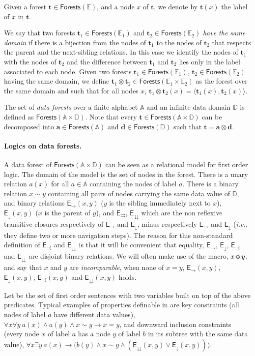 \documentclass{CSML}
\newcommand\ra{\ensuremath{\rightarrow}}
\newcommand\dataeq{\ensuremath{\sim}}
\newcommand\A{\ensuremath{\mathbb{A}}\xspace}
\newcommand\D{\mathbb{D}}
\newcommand\E{\mathbb{E}}
\newcommand\Forests{\mathsf{Forests}}
\newcommand\tree{\boldsymbol{t}}
\newcommand\atree{\boldsymbol{a}}
\newcommand\dtree{\boldsymbol{d}}
\newcommand\EE{\mathsf{E}}
\newcommand\NS{\EE_{\rightarrow}}
\newcommand\PC{\EE_{\downarrow}}
\newcommand\SAD{\EE_{\downdownarrows}}
\newcommand\SFS{\EE_{\rightrightarrows}}
\renewcommand\parallel{\mathbin{\!<\mkern-12mu>\!}}
\begin{document}
Given a forest $\tree \in \Forests(\E)$, and a node $x$ of $\tree$, we denote
by $\tree(x)$ the label of $x$ in $\tree$.

We say that two forests $\tree_1 \in \Forests(\E_1)$ 
and $\tree_2 \in \Forests(\E_2)$ 
\emph{have the same domain} if there is a bijection from the
nodes of $\tree_1$ to the nodes of $\tree_2$ 
that respects the parent and the next-sibling relations. 
In this case we identify the nodes of $\tree_1$ with
the nodes of $\tree_2$ and the difference between $\tree_1$ and $\tree_2$ lies
only in the label associated to each node. 
Given two forests $\tree_1 \in \Forests(\E_1)$, 
$\tree_2 \in \Forests(\E_2)$ having the same domain, 
we define $\tree_1 \otimes \tree_2 \in \Forests(\E_1\times\E_2)$ 
as the forest over the same domain 
and such that for all nodes $x$, 
$\tree_1 \otimes \tree_2 (x) = \langle \tree_1(x),\tree_2(x)\rangle$.

The set of \emph{data forests} over a finite alphabet $\A$ 
and an infinite data domain $\D$  is defined as $\Forests(\A {\times} \D)$. 
Note that every $\tree \in \Forests(\A {\times} \D)$ 
can be decomposed into $\atree \in \Forests(\A)$ 
and $\dtree \in \Forests(\D)$ such that $\tree = \atree \otimes \dtree$.


\paragraph{Logics on data forests.}
A data forest of $\Forests(\A {\times} \D)$ can be seen as a relational model for
first order logic.  The domain of the model is the set of nodes in the
forest.  There is a unary relation $a(x)$ for all $a \in \A$ containing
the nodes of label $a$. There is a binary relation $x \dataeq y$ containing all
pairs of nodes carrying the same data value of $\D$, 
and binary relations $\NS(x,y)$ ($y$ is the sibling immediately next to $x$),
$\PC(x,y)$ ($x$ is the parent of $y$), and $\SFS$, $\SAD$ which are the non
reflexive transitive closures respectively of $\NS$ and $\PC$, minus
respectively $\NS$ and $\PC$ (\textit{i.e.}, they define two or more navigation steps).
The reason for this non-standard definition of $\SFS$ and $\SAD$ is that it
will be convenient that equality, $\NS$, $\PC$, $\SFS$ and $\SAD$ are disjoint
binary relations. We will often make use of the macro, $x \parallel y$, and say
that $x$ and $y$ are \emph{incomparable}, when none of $x = y$, $\NS(x,y)$,
$\PC(x,y)$, $\SFS(x,y)$ and $\SAD(x,y)$ holds.


Let \fotwo be the set of first order sentences with two variables built on top
of the above predicates. Typical examples of properties definable in \fotwo are
key constraints (all nodes of label $a$ have different data values), $\forall x
\forall y ~a(x) \land a(y) \land x \sim y \ra x=y$, and downward inclusion
constraints (every node $x$ of label $a$ has a node $y$ of label $b$ in its
subtree with the same data value), 
$\forall x \exists y ~a(x) \ra \bigl(b(y) \land x \sim y \land (\SAD(x,y) \lor \PC(x,y))\bigr)$.
\end{document}
